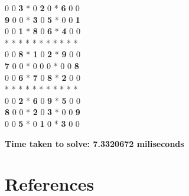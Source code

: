 \documentclass[12pt]{article}
\begin{document}
\begin{flushleft}
0 0 \textbf{3} * 0 \textbf{2} 0 * \textbf{6} 0 0\\
\textbf{9} 0 0 * \textbf{3} 0 \textbf{5} * 0 0 \textbf{1}\\
0 0 \textbf{1} * \textbf{8} 0 \textbf{6} *\textbf{ 4} 0 0\\
* * * * * * * * * * * \\
0 0 \textbf{8} * \textbf{1} 0 \textbf{2} * \textbf{9} 0 0\\
\textbf{7} 0 0 * 0 0 0 * 0 0 \textbf{8}\\
0 0 \textbf{6} * \textbf{7} 0 \textbf{8} * \textbf{2} 0 0\\
* * * * * * * * * * * \\
0 0 \textbf{2} * \textbf{6} 0 \textbf{9} * \textbf{5} 0 0\\
\textbf{8} 0 0 * \textbf{2} 0\textbf{ 3} * 0 0 \textbf{9}\\
0 0 \textbf{5} * 0 \textbf{1} 0 * \textbf{3} 0 0
\end{flushleft}



\begin{flushleft}
\textbf{Time taken to solve: 7.3320672 miliseconds}
\end{flushleft}
\section{References}
\end{document}
